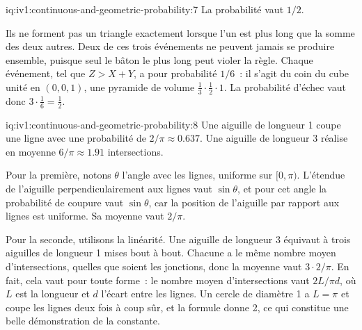 \begin{solution}{iq:iv1:continuous-and-geometric-probability:7}
La probabilité vaut $1/2$.

Ils ne forment pas un triangle exactement lorsque l'un est plus long que la somme des deux autres. Deux de ces trois événements ne peuvent jamais se produire ensemble, puisque seul le bâton le plus long peut violer la règle. Chaque événement, tel que $Z > X + Y$, a pour probabilité $1/6$~: il s'agit du coin du cube unité en $(0, 0, 1)$, une pyramide de volume $\tfrac13 \cdot \tfrac12 \cdot 1$. La probabilité d'échec vaut donc $3 \cdot \tfrac16 = \tfrac12$.

\end{solution}

\begin{solution}{iq:iv1:continuous-and-geometric-probability:8}
Une aiguille de longueur 1 coupe une ligne avec une probabilité de $2/\pi \approx 0.637$. Une aiguille de longueur 3 réalise en moyenne $6/\pi \approx 1.91$ intersections.

Pour la première, notons $\theta$ l'angle avec les lignes, uniforme sur $[0, \pi)$. L'étendue de l'aiguille perpendiculairement aux lignes vaut $\sin\theta$, et pour cet angle la probabilité de coupure vaut $\sin\theta$, car la position de l'aiguille par rapport aux lignes est uniforme. Sa moyenne vaut $2/\pi$.

Pour la seconde, utilisons la linéarité. Une aiguille de longueur 3 équivaut à trois aiguilles de longueur 1 mises bout à bout. Chacune a le même nombre moyen d'intersections, quelles que soient les jonctions, donc la moyenne vaut $3 \cdot 2/\pi$. En fait, cela vaut pour toute forme~: le nombre moyen d'intersections vaut $2L/\pi d$, où $L$ est la longueur et $d$ l'écart entre les lignes. Un cercle de diamètre 1 a $L = \pi$ et coupe les lignes deux fois à coup sûr, et la formule donne 2, ce qui constitue une belle démonstration de la constante.

\end{solution}

